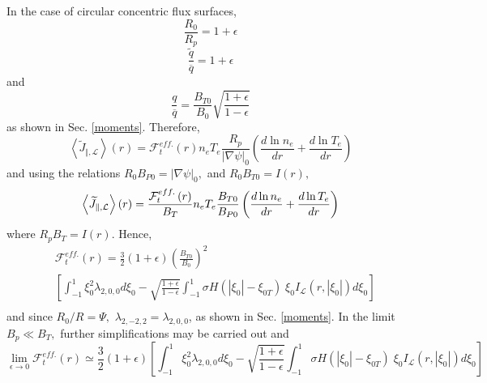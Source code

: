 In the case of circular concentric flux surfaces,
\begin{equation}
\frac{R_{0}}{R_{p}}=1+\epsilon
\end{equation}
\begin{equation}
\frac{\widetilde{q}}{\overline{q}}=1+\epsilon
\end{equation}
and
\begin{equation}
\frac{q}{\overline{q}}=\frac{B_{T0}}{B_{0}}\sqrt{\frac{1+\epsilon }{
1-\epsilon }}
\end{equation}
as shown in Sec. \ref{moments}. Therefore,
\begin{equation}
\left\langle \widetilde{J}_{\Vert ,\mathcal{L}}\right\rangle \left( r\right)
=\mathcal{F}_{t}^{eff.}\left( r\right) n_{e}T_{e}\frac{R_{p}}{\left| \nabla
\psi \right| _{0}}\left( \frac{d\ln n_{e}}{dr}+\frac{d\ln T_{e}}{dr}\right)
\end{equation}
and using the relations $R_{0}B_{P0}=\left| \nabla \psi \right| _{0},$ and $
R_{0}B_{T0}=I\left( r\right) ,$%
\begin{equation}
\left\langle \widetilde{J}_{\Vert ,\mathcal{L}}\right\rangle \left( r\right)
=\frac{\mathcal{F}_{t}^{eff.}\left( r\right) }{B_{T}}n_{e}T_{e}\frac{B_{T0}}{%
B_{P0}}\left( \frac{d\ln n_{e}}{dr}+\frac{d\ln T_{e}}{dr}\right)
\end{equation}
where $R_{p}B_{T}=I\left( r\right) .$ Hence,
\begin{align}
&\mathcal{F}_{t}^{eff.}\left( r\right) =\frac{3}{2}\left(
1+\epsilon \right) \left( \frac{B_{T0}}{B_{0}}\right)
^{2}\nonumber\\&\left[ \int_{-1}^{1}\xi
_{0}^{2}\lambda _{2,0,0}d\xi _{0}-\sqrt{\frac{1+\epsilon }{1-\epsilon }}%
\int_{-1}^{1}\sigma H\left( \left| \xi _{0}\right| -\xi _{0T}\right) \;\xi
_{0}I_{\mathcal{L}}\left( r,\left| \xi _{0}\right| \right) d\xi _{0}\right]\nonumber\\
\end{align}
and since $R_{0}/R=\Psi ,$ $\lambda _{2,-2,2}=\lambda _{2,0,0}$,
as shown in Sec. \ref{moments}. In the limit $B_{p}\ll B_{T},$
further simplifications may be carried out and
\begin{equation}
\lim_{\epsilon \rightarrow 0}\mathcal{F}_{t}^{eff.}\left( r\right) \simeq
\frac{3}{2}\left( 1+\epsilon \right) \left[ \int_{-1}^{1}\xi _{0}^{2}\lambda
_{2,0,0}d\xi _{0}-\sqrt{\frac{1+\epsilon }{1-\epsilon }}\int_{-1}^{1}\sigma
H\left( \left| \xi _{0}\right| -\xi _{0T}\right) \;\xi _{0}I_{\mathcal{L}%
}\left( r,\left| \xi _{0}\right| \right) d\xi _{0}\right]
\end{equation}

